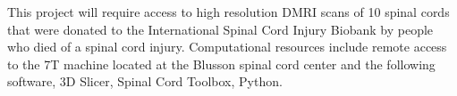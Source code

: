 This project will require access to high resolution DMRI scans of 10 spinal cords that were donated to the International Spinal Cord Injury Biobank by people who died of a spinal cord injury. Computational resources include remote access to the 7T machine located at the Blusson spinal cord center and the following software, 3D Slicer, Spinal Cord Toolbox, Python.
